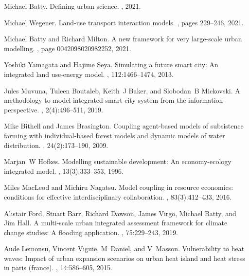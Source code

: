 \begin{thebibliography}{10}
Michael Batty.
\newblock Defining urban science.
, 2021.

Michael Wegener.
\newblock Land-use transport interaction models.
, pages 229--246, 2021.

Michael Batty and Richard Milton.
\newblock A new framework for very large-scale urban modelling.
, page 0042098020982252, 2021.

Yoshiki Yamagata and Hajime Seya.
\newblock Simulating a future smart city: An integrated land use-energy model.
, 112:1466--1474, 2013.

Jules Muvuna, Tuleen Boutaleb, Keith~J Baker, and Slobodan~B Mickovski.
\newblock A methodology to model integrated smart city system from the
  information perspective.
, 2(4):496--511, 2019.

Mike Bithell and James Brasington.
\newblock Coupling agent-based models of subsistence farming with
  individual-based forest models and dynamic models of water distribution.
, 24(2):173--190, 2009.

Marjan~W Hofkes.
\newblock Modelling sustainable development: An economy-ecology integrated
  model.
, 13(3):333--353, 1996.

Miles MacLeod and Michiru Nagatsu.
\newblock Model coupling in resource economics: conditions for effective
  interdisciplinary collaboration.
, 83(3):412--433, 2016.

Alistair Ford, Stuart Barr, Richard Dawson, James Virgo, Michael Batty, and Jim
  Hall.
\newblock A multi-scale urban integrated assessment framework for climate
  change studies: A flooding application.
, 75:229--243, 2019.

Aude Lemonsu, Vincent Viguie, M~Daniel, and V~Masson.
\newblock Vulnerability to heat waves: Impact of urban expansion scenarios on
  urban heat island and heat stress in paris (france).
, 14:586--605, 2015.


\end{thebibliography}
